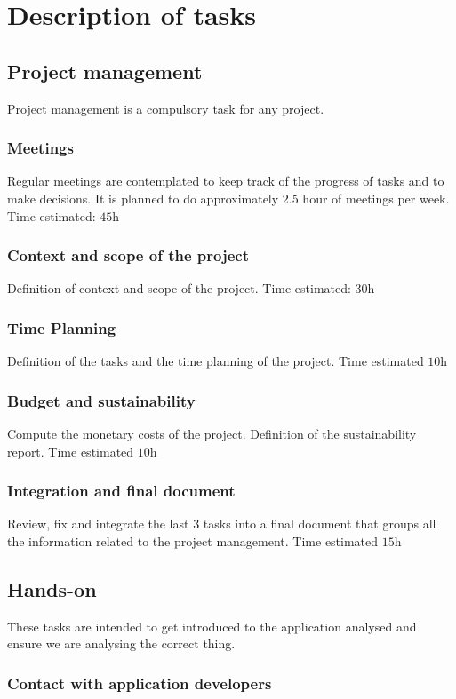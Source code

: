 \section{Description of tasks}

\subsection{Project management}

Project management is a compulsory task for any project. 

\subsubsection{Meetings}
Regular meetings are contemplated to keep track of the progress of tasks and to make decisions. It is planned to do approximately 2.5 hour of meetings per week. Time estimated: $\si{45\hour}$ 
\subsubsection{Context and scope of the project}
Definition of context and scope of the project. Time estimated: $\si{30\hour}$
\subsubsection{Time Planning}
Definition of the tasks and the time planning of the project. Time estimated $\si{10\hour}$
\subsubsection{Budget and sustainability}
Compute the monetary costs of the project. Definition of the sustainability report. Time estimated $\si{10\hour}$
\subsubsection{Integration and final document}
Review, fix and integrate the last 3 tasks into a final document that groups all the information related to the project management. Time estimated $\si{15\hour}$

\subsection{Hands-on}
These tasks are intended to get introduced to the application analysed and ensure we are analysing the correct thing.
\subsubsection{Contact with application developers}

